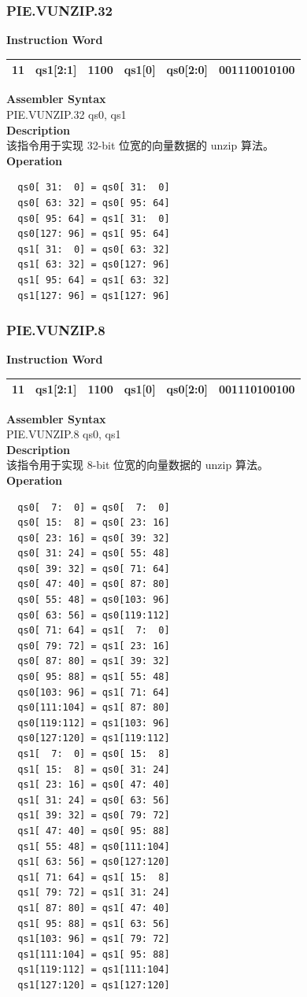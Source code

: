 \newpage
\subsubsection{PIE.VUNZIP.32}\label{instruction:PIEVUNZIP32}
\setlength\tabcolsep{6pt}
\textbf{Instruction Word} \\
\begin{tabular}{|c|c|c|c|c|c|}
	\hline
	11 & qs1[2:1] & 1100 & qs1[0] & qs0[2:0] & 001110010100 \\
	\hline
\end{tabular}

\textbf{Assembler Syntax} \\
PIE.VUNZIP.32 qs0, qs1 \\
\textbf{Description} \\
该指令用于实现 32-bit 位宽的向量数据的 unzip 算法。\\
\textbf{Operation}
\begin{lstlisting}
  qs0[ 31:  0] = qs0[ 31:  0]
  qs0[ 63: 32] = qs0[ 95: 64]
  qs0[ 95: 64] = qs1[ 31:  0]
  qs0[127: 96] = qs1[ 95: 64]
  qs1[ 31:  0] = qs0[ 63: 32]
  qs1[ 63: 32] = qs0[127: 96]
  qs1[ 95: 64] = qs1[ 63: 32]
  qs1[127: 96] = qs1[127: 96]
\end{lstlisting}

\newpage
\subsubsection{PIE.VUNZIP.8}\label{instruction:PIEVUNZIP8}
\setlength\tabcolsep{6pt}
\textbf{Instruction Word} \\
\begin{tabular}{|c|c|c|c|c|c|}
	\hline
	11 & qs1[2:1] & 1100 & qs1[0] & qs0[2:0] & 001110100100 \\
	\hline
\end{tabular}

\textbf{Assembler Syntax} \\
PIE.VUNZIP.8 qs0, qs1 \\
\textbf{Description} \\
该指令用于实现 8-bit 位宽的向量数据的 unzip 算法。\\
\textbf{Operation}
\begin{lstlisting}
  qs0[  7:  0] = qs0[  7:  0]
  qs0[ 15:  8] = qs0[ 23: 16]
  qs0[ 23: 16] = qs0[ 39: 32]
  qs0[ 31: 24] = qs0[ 55: 48]
  qs0[ 39: 32] = qs0[ 71: 64]
  qs0[ 47: 40] = qs0[ 87: 80]
  qs0[ 55: 48] = qs0[103: 96]
  qs0[ 63: 56] = qs0[119:112]
  qs0[ 71: 64] = qs1[  7:  0]
  qs0[ 79: 72] = qs1[ 23: 16]
  qs0[ 87: 80] = qs1[ 39: 32]
  qs0[ 95: 88] = qs1[ 55: 48]
  qs0[103: 96] = qs1[ 71: 64]
  qs0[111:104] = qs1[ 87: 80]
  qs0[119:112] = qs1[103: 96]
  qs0[127:120] = qs1[119:112]
  qs1[  7:  0] = qs0[ 15:  8]
  qs1[ 15:  8] = qs0[ 31: 24]
  qs1[ 23: 16] = qs0[ 47: 40]
  qs1[ 31: 24] = qs0[ 63: 56]
  qs1[ 39: 32] = qs0[ 79: 72]
  qs1[ 47: 40] = qs0[ 95: 88]
  qs1[ 55: 48] = qs0[111:104]
  qs1[ 63: 56] = qs0[127:120]
  qs1[ 71: 64] = qs1[ 15:  8]
  qs1[ 79: 72] = qs1[ 31: 24]
  qs1[ 87: 80] = qs1[ 47: 40]
  qs1[ 95: 88] = qs1[ 63: 56]
  qs1[103: 96] = qs1[ 79: 72]
  qs1[111:104] = qs1[ 95: 88]
  qs1[119:112] = qs1[111:104]
  qs1[127:120] = qs1[127:120]
\end{lstlisting}

